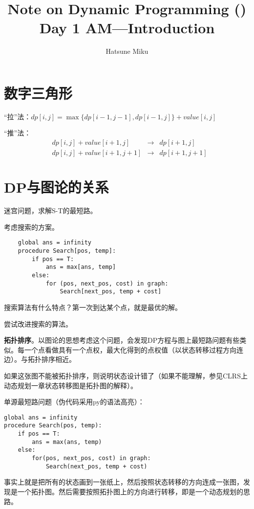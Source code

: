\documentclass{article}
\newcommand{\romannum}[1]{\uppercase\expandafter{\romannumeral#1}}
\begin{document}
\title{Note on Dynamic Programming (\romannum{1})\\\large{Day 1 AM---Introduction}}\date{}\author{Hatsune Miku}
\maketitle
\section{数字三角形}
“拉”法：$dp[i,j]=\max\{dp[i-1,j-1],dp[i-1,j]\}+value[i,j]$

“推”法：
\begin{equation*}
\begin{aligned}
&dp[i,j]+value[i+1,j]&\to&dp[i+1,j]\\
&dp[i,j]+value[i+1,j+1]&\to&dp[i+1,j+1]
\end{aligned}
\end{equation*}
\section{DP与图论的关系}
迷宫问题，求解S-T的最短路。

考虑搜索的方案。
\begin{verbatim}
    global ans = infinity
    procedure Search[pos, temp]:
        if pos == T:
            ans = max[ans, temp]
        else:
            for (pos, next_pos, cost) in graph:
                Search[next_pos, temp + cost]
\end{verbatim}

搜索算法有什么特点？第一次到达某个点，就是最优的解。

尝试改进搜索的算法。

\textbf{拓扑排序}。以图论的思想考虑这个问题，会发现DP方程与图上最短路问题有些类似。每一个点看做具有一个点权，最大化得到的点权值（以状态转移过程方向连边）。与拓扑排序相近。

如果这张图不能被拓扑排序，则说明状态设计错了（如果不能理解，参见CLRS上动态规划一章状态转移图是拓扑图的解释）。

单源最短路问题（伪代码采用py的语法高亮）：
\begin{verbatim}
global ans = infinity
procedure Search(pos, temp):
    if pos == T:
        ans = max(ans, temp)
    else:
        for(pos, next_pos, cost) in graph:
            Search(next_pos, temp + cost)
\end{verbatim}
事实上就是把所有的状态画到一张纸上，然后按照状态转移的方向连成一张图，发现是一个拓扑图。然后需要按照拓扑图上的方向进行转移，即是一个动态规划的思路。
\end{document}
